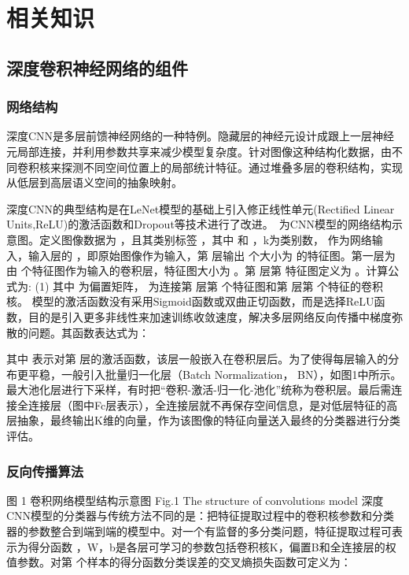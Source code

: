 \chapter{相关知识}
\label{chap:basicknowledge}
 
\section{深度卷积神经网络的组件}

 
\subsection{网络结构}

深度CNN是多层前馈神经网络的一种特例。隐藏层的神经元设计成跟上一层神经元局部连接，并利用参数共享来减少模型复杂度。针对图像这种结构化数据，由不同卷积核来探测不同空间位置上的局部统计特征。通过堆叠多层的卷积结构，实现从低层到高层语义空间的抽象映射。

深度CNN的典型结构是在LeNet模型\citep{Jarrett2009}的基础上引入修正线性单元(Rectified Linear Units,ReLU)的激活函数和Dropout等技术\citep{Krizhevsky2012}进行了改进。\ 为CNN模型的网络结构示意图。定义图像数据为 ，且其类别标签 ，其中 和 ，k为类别数， 作为网络输入，输入层的 ，即原始图像作为输入，第 层输出 个大小为 的特征图。第一层为由  个特征图作为输入的卷积层，特征图大小为  。第 层第 特征图定义为  。计算公式为:
      (1)
其中 为偏置矩阵， 为连接第 层第 个特征图和第 层第 个特征的卷积核。
模型的激活函数没有采用Sigmoid函数或双曲正切函数，而是选择ReLU函数，目的是引入更多非线性来加速训练收敛速度，解决多层网络反向传播中梯度弥散的问题。其函数表达式为： 
             
 其中 表示对第 层的激活函数，该层一般嵌入在卷积层后。为了使得每层输入的分布更平稳，一般引入批量归一化层（Batch Normalization， BN），如图1中所示。最大池化层进行下采样，有时把“卷积-激活-归一化-池化”统称为卷积层。最后需连接全连接层（图中Fc层表示），全连接层就不再保存空间信息，是对低层特征的高层抽象，最终输出K维的向量，作为该图像的特征向量送入最终的分类器进行分类评估。

\subsection{反向传播算法} 
图 1 卷积网络模型结构示意图
Fig.1 The structure of convolutions model
深度CNN模型的分类器与传统方法不同的是：把特征提取过程中的卷积核参数和分类器的参数整合到端到端的模型中。对一个有监督的多分类问题，特征提取过程可表示为得分函数 ，W，b是各层可学习的参数包括卷积核K，偏置B和全连接层的权值参数。对第 个样本的得分函数分类误差的交叉熵损失函数可定义为：
  	 
